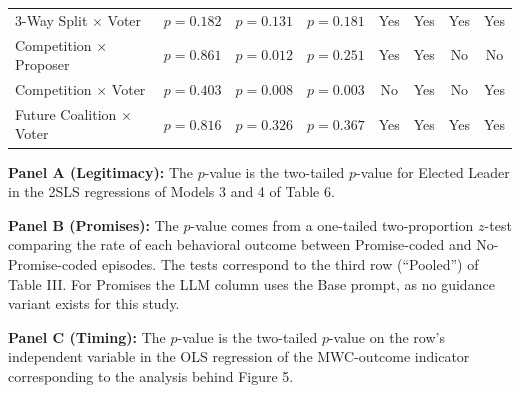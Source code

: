 \begin{landscape}
\begin{threeparttable}
\begin{tabular}{l@{\hskip 20pt} ccc @{\hskip 20pt} cc @{\hskip 20pt} cc}
3-Way Split $\times$ Voter & $p=0.182$ & $p=0.131$ & $p=0.181$ & Yes & Yes & Yes & Yes \\
Competition $\times$ Proposer & $p=0.861$ & $p=0.012$ & $p=0.251$ & Yes & Yes & No & No \\
Competition $\times$ Voter & $p=0.403$ & $p=0.008$ & $p=0.003$ & No & Yes & No & Yes \\
Future Coalition $\times$ Voter & $p=0.816$ & $p=0.326$ & $p=0.367$ & Yes & Yes & Yes & Yes \\
\bottomrule
\end{tabular}
\begin{tablenotes}[flushleft]
\footnotesize
\item \textbf{Panel A (Legitimacy):} The $p$-value is the two-tailed $p$-value for Elected Leader in the 2SLS regressions of Models 3 and 4 of Table 6.
\item \textbf{Panel B (Promises):} The $p$-value comes from a one-tailed two-proportion $z$-test comparing the rate of each behavioral outcome between Promise-coded and No-Promise-coded episodes. The tests correspond to the third row (\textquotedblleft Pooled\textquotedblright) of Table III. For Promises the LLM column uses the Base prompt, as no guidance variant exists for this study.
\item \textbf{Panel C (Timing):} The $p$-value is the two-tailed $p$-value on the row's independent variable in the OLS regression of the MWC-outcome indicator corresponding to the analysis behind Figure 5.
\end{tablenotes}
\end{threeparttable}
\end{landscape}
